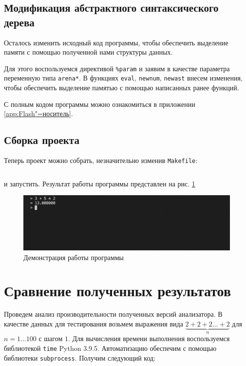 \documentclass[referat]{SCWorks}
\begin{document}
\subsection{Модификация абстрактного синтаксического дерева}
Осталось изменить исходный код программы, чтобы обеспечить выделение памяти с помощью полученной нами структуры данных.

Для этого воспользуемся директивой \verb|%param| и заявим в качестве параметра переменную типа \verb|arena*|. В функциях \verb|eval|, \verb|newnum|, \verb|newast| внесем изменения, чтобы обеспечить выделение памятью с помощью написанных ранее функций.

С полным кодом программы можно ознакомиться в приложении \ref{app:Flash"=носитель}.

\subsection{Сборка проекта}
Теперь проект можно собрать, незначительно изменив \verb|Makefile|:

\inputminted[fontsize=\small, breaklines=true, style=bw, linenos]{cpp}{Makefile}

\noindent и запустить. Результат работы программы представлен на рис. \ref{fig:Демонстрация работы программы}

\begin{figure}[H]
    \centering
    \includegraphics[scale=0.5]{naivetest.png}
    \caption{Демонстрация работы программы}
    \label{fig:Демонстрация работы программы}
\end{figure}

\section{Сравнение полученных результатов}
Проведем анализ производительности полученных версий анализатора. В качестве данных для тестирования возьмем выражения вида $\underbrace{2 + 2 + 2\dots+ 2}_{n}$ для $n = 1\dots100$ с шагом $1$. Для вычисления времени выполнения воспользуемся библиотекой \verb|time| Python 3.9.5. Автоматизацию обеспечим с помощью библиотеки \verb|subprocess|. Получим следующий код:
\end{document}

